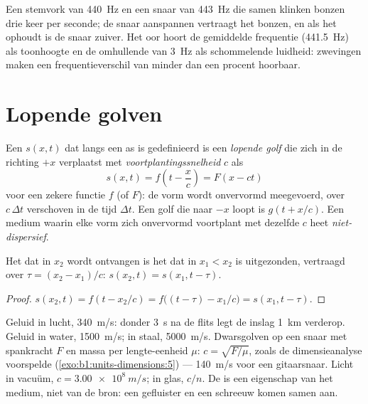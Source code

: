 \begin{example}\label{ex:b1:wave-propagation:tuning}
Een stemvork van \qty{440}{Hz} en een snaar van \qty{443}{Hz} die samen
klinken bonzen drie keer per seconde; de snaar aanspannen vertraagt het
bonzen, en als het ophoudt is de snaar zuiver. Het oor hoort de gemiddelde
frequentie (\qty{441.5}{Hz}) als toonhoogte en de omhullende van \qty{3}{Hz}
als schommelende luidheid: zwevingen maken een frequentieverschil van minder
dan een procent hoorbaar.
\end{example}

\section{Lopende golven}

\begin{definition}\label{def:b1:wave-propagation:travelling}
Een  $s(x, t)$ dat langs een as is gedefinieerd is een \emph{lopende
golf} die zich in de richting $+x$ verplaatst met \emph{voortplantingssnelheid} $c$ als
\[
s(x, t) = f\!\left(t - \frac{x}{c}\right) = F(x - ct)
\]
voor een zekere functie $f$ (of $F$): de vorm wordt onvervormd meegevoerd,
over $c\,\Delta t$ verschoven in de tijd $\Delta t$. Een golf die naar $-x$ loopt is
$g(t + x/c)$. Een medium waarin elke vorm zich onvervormd voortplant met
dezelfde $c$ heet \emph{niet-dispersief}.
\end{definition}

\begin{proposition}[Vertraging]\label{prop:b1:wave-propagation:delay}
Het  dat in $x_2$ wordt ontvangen is het  dat in $x_1 < x_2$ is
uitgezonden, vertraagd over $\tau = (x_2 - x_1)/c$: $s(x_2, t) = s(x_1, t - \tau)$.
\end{proposition}

\begin{proof}
$s(x_2, t) = f(t - x_2/c) = f\big((t - \tau) - x_1/c\big) = s(x_1, t - \tau)$.
\end{proof}

\begin{example}[Voortplantingssnelheden]\label{ex:b1:wave-propagation:celerities}
Geluid in lucht, \qty{340}{m/s}: donder \qty{3}{s} na de flits legt de
inslag \qty{1}{km} verderop. Geluid in water, \qty{1500}{m/s}; in staal,
\qty{5000}{m/s}. Dwarsgolven op een snaar met spankracht $F$ en massa
per lengte-eenheid $\mu$: $c = \sqrt{F/\mu}$, zoals de dimensieanalyse
voorspelde (\cref{exo:b1:units-dimensions:5}) --- \qty{140}{m/s} voor een
gitaarsnaar. Licht in vacuüm, $c = \qty{3.00e8}{m/s}$; in glas,
$c/n$. De  is een eigenschap van het medium, niet van
de bron: een gefluister en een schreeuw komen samen aan.
\end{example}

